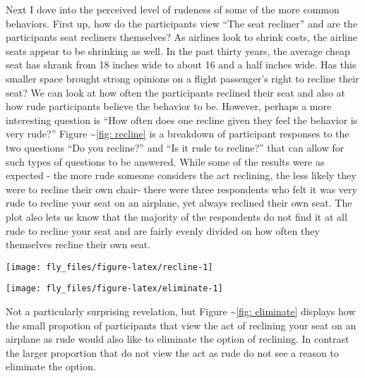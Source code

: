 Next I dove into the perceived level of rudeness of some of the more
common behaviors. First up, how do the participants view ``The seat
recliner'' and are the participants seat recliners themselves? As
airlines look to shrink costs, the airline seats appear to be shrinking
as well. In the past thirty years, the average cheap seat has shrank
from 18 inches wide to about 16 and a half inches wide. \citet{washpost}
Has this smaller space brought strong opinions on a flight passenger's
right to recline their seat? We can look at how often the participants
reclined their seat and also at how rude participants believe the
behavior to be. However, perhaps a more interesting question is ``How
often does one recline given they feel the behavior is very rude?''
Figure \textasciitilde{}\ref{fig: recline} is a breakdown of participant
responses to the two questions ``Do you recline?'' and ``Is it rude to
recline?'' that can allow for such types of questions to be answered.
While some of the results were as expected - the more rude someone
considers the act reclining, the less likely they were to recline their
own chair- there were three respondents who felt it was very rude to
recline your seat on an airplane, yet always reclined their own seat.
The plot also lets us know that the majority of the respondents do not
find it at all rude to recline your seat and are fairly evenly divided
on how often they themselves recline their own seat.

\begin{Schunk}


\begin{center}\texttt{[image: fly\_files/figure-latex/recline-1]} \end{center}

\end{Schunk}

\begin{Schunk}


\begin{center}\texttt{[image: fly\_files/figure-latex/eliminate-1]} \end{center}

\end{Schunk}

Not a particularly surprising revelation, but Figure
\textasciitilde{}\ref{fig: eliminate} displays how the small propotion
of participants that view the act of reclining your seat on an airplane
as rude would also like to eliminate the option of reclining. In
contrast the larger proportion that do not view the act as rude do not
see a reason to eliminate the option.

